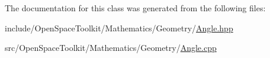 The documentation for this class was generated from the following files\+:\begin{DoxyCompactItemize}
\item 
include/\+Open\+Space\+Toolkit/\+Mathematics/\+Geometry/\hyperlink{_angle_8hpp}{Angle.\+hpp}\item 
src/\+Open\+Space\+Toolkit/\+Mathematics/\+Geometry/\hyperlink{_angle_8cpp}{Angle.\+cpp}\end{DoxyCompactItemize}

